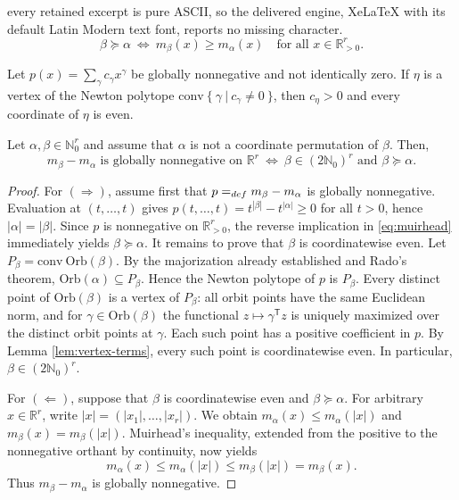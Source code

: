 \documentclass[10pt,a4paper]{amsart}
\newcommand{\Nat}{\mathbb{N}}
\newcommand{\Orb}{\mathrm{Orb}}
\newcommand{\Real}{\mathbb{R}}
\newcommand{\conv}{\mathrm{conv}}
\begin{document}
every retained excerpt is pure ASCII, so the delivered engine, XeLaTeX with its default Latin Modern text font, reports no missing character.
\begin{equation}
  \beta\succeq\alpha
  ~\Longleftrightarrow~
  m_\beta(x)\geq m_\alpha(x)
  \quad\text{for all }x\in\Real_{>0}^r. \label{eq:muirhead}
\end{equation}

\begin{lemma}\label{lem:vertex-terms}
Let $p(x)=\sum_\gamma c_\gamma x^\gamma$ be globally nonnegative and not identically zero.  If $\eta$ is a vertex of the Newton polytope
$\conv\ \{~\gamma~|~c_\gamma\neq 0~\}$, then $c_\eta>0$ and every coordinate of
$\eta$ is even.
\end{lemma}

\begin{theorem}
\label{thm:characterization}
Let $\alpha,\beta\in\Nat_0^r$ and assume that $\alpha$ is not a coordinate permutation of $\beta$.  Then, 
\[
m_\beta-m_\alpha \textrm{ is globally nonnegative on $\Real^r$}
~\Longleftrightarrow~ 
\beta\in(2\Nat_0)^r \textrm{ and $\beta\succeq\alpha$}.
\]
\end{theorem}

\begin{proof}
For $(\Rightarrow)$, assume first that $p=_{\rm def} m_\beta-m_\alpha$ is globally nonnegative. Evaluation at $(t,\ldots,t)$ gives
$p(t,\ldots,t)=t^{|\beta|}-t^{|\alpha|}\geq 0$ for all $t>0$, 
hence $|\alpha|=|\beta|$.  Since $p$ is nonnegative on
$\Real_{>0}^r$, the reverse implication in \eqref{eq:muirhead}
immediately yields $\beta\succeq\alpha$.
It remains to prove that $\beta$ is coordinatewise even.
Let $P_\beta=\conv\ \Orb(\beta)$.  By the majorization already
established and Rado's theorem, $\Orb(\alpha)\subseteq P_\beta$. Hence the Newton polytope of $p$ is $P_\beta$.  Every distinct point of $\Orb(\beta)$ is a vertex of $P_\beta$: all orbit points have the same Euclidean norm, and for
$\gamma\in\Orb(\beta)$ the functional $z\mapsto\gamma^{\mathsf T}z$ is uniquely maximized over the distinct orbit points at $\gamma$.  Each such
point has a positive coefficient in $p$.  By Lemma
\ref{lem:vertex-terms}, every such point is coordinatewise even.  In
particular, $\beta\in(2\Nat_0)^r$.

For $(\Leftarrow)$, suppose that $\beta$ is coordinatewise even and $\beta\succeq\alpha$.  For arbitrary $x\in\Real^r$, write
$|x|=(|x_1|,\ldots,|x_r|)$. We obtain $m_\alpha(x)\leq m_\alpha(|x|)$ and $m_\beta(x)=m_\beta(|x|)$.
Muirhead's inequality, extended from the positive to the nonnegative orthant by continuity, now yields
\[
  m_\alpha(x)
  \leq m_\alpha(|x|)
  \leq m_\beta(|x|)
  =m_\beta(x).
\]
Thus $m_\beta-m_\alpha$ is globally nonnegative.
\end{proof}
\end{document}
